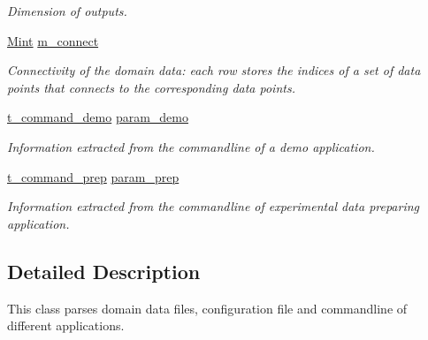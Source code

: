 \begin{DoxyCompactItemize}
\begin{DoxyCompactList}\small\item\em Dimension of outputs. \end{DoxyCompactList}\item 
\hypertarget{classpgpr__parse_a1e1b0be13a510fd547620a8971874407}{\hyperlink{classpgpr__matrix}{Mint} \hyperlink{classpgpr__parse_a1e1b0be13a510fd547620a8971874407}{m\+\_\+connect}}\label{classpgpr__parse_a1e1b0be13a510fd547620a8971874407}

\begin{DoxyCompactList}\small\item\em Connectivity of the domain data\+: each row stores the indices of a set of data points that connects to the corresponding data points. \end{DoxyCompactList}\item 
\hypertarget{classpgpr__parse_ace1bdb63deaf2a5c680613c33cfc625e}{\hyperlink{structt__command__demo}{t\+\_\+command\+\_\+demo} \hyperlink{classpgpr__parse_ace1bdb63deaf2a5c680613c33cfc625e}{param\+\_\+demo}}\label{classpgpr__parse_ace1bdb63deaf2a5c680613c33cfc625e}

\begin{DoxyCompactList}\small\item\em Information extracted from the commandline of a demo application. \end{DoxyCompactList}\item 
\hypertarget{classpgpr__parse_a86c109ef49507a1be375201d0ac4af8e}{\hyperlink{structt__command__prep}{t\+\_\+command\+\_\+prep} \hyperlink{classpgpr__parse_a86c109ef49507a1be375201d0ac4af8e}{param\+\_\+prep}}\label{classpgpr__parse_a86c109ef49507a1be375201d0ac4af8e}

\begin{DoxyCompactList}\small\item\em Information extracted from the commandline of experimental data preparing application. \end{DoxyCompactList}\end{DoxyCompactItemize}


\subsection{Detailed Description}
This class parses domain data files, configuration file and commandline of different applications. 

